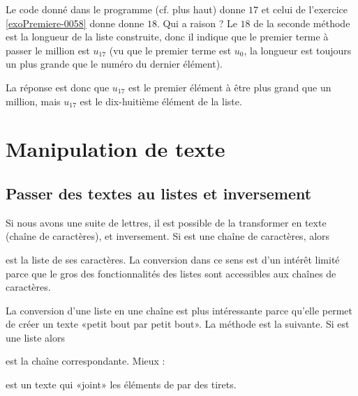 
\begin{remark}
    
    Le code donné dans le programme  (cf. plus haut) donne \( 17\) et celui de l'exercice \ref{exoPremiere-0058} donne donne \( 18\). Qui a raison ? Le \( 18\) de la seconde méthode est la longueur de la liste construite, donc il indique que le premier terme à passer le million est \( u_{17}\) (vu que le premier terme est \( u_0\), la longueur est toujours un plus grande que le numéro du dernier élément).

La réponse est donc que \( u_{17}\) est le premier élément à être plus grand que un million, mais \( u_{17}\) est le dix-huitième élément de la liste.

\end{remark}


\chapter{Manipulation de texte}

\section{Passer des textes au listes et inversement}

Si nous avons une suite de lettres, il est possible de la transformer en texte (chaîne de caractères), et inversement. Si  est une chaîne de caractères, alors
\begin{quote}
\end{quote}
est la liste de ses caractères. La conversion dans ce sens est d'un intérêt limité parce que le gros des fonctionnalités des listes sont accessibles aux chaînes de caractères.

La conversion d'une liste en une chaîne est plus intéressante parce qu'elle permet de créer un texte «petit bout par petit bout». La méthode est la suivante. Si  est une liste alors
\begin{quote}
\end{quote}
est la chaîne correspondante. Mieux : 
\begin{quote}
\end{quote}
est un texte qui «joint» les éléments de  par des tirets.

